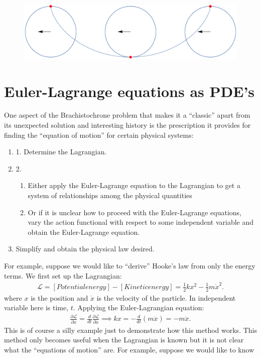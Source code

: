 \documentclass{article}
\newcommand{\p}{\partial}
\newcommand{\lag}{\mathcal{L}}
\newcommand{\f}[2]{\frac{#1}{#2}}
\begin{document}
\begin{figure}[h!]
	\centering
	\includegraphics[scale=0.35, angle=180]{cycloid.eps}
\end{figure}



\section{Euler-Lagrange equations as PDE's}

One aspect of the Brachistochrone problem that makes it a ``classic'' apart from its unexpected solution and interesting history is the prescription it provides for finding the ``equation of motion'' for certain physical systems:
\begin{enumerate}
	\item 1. Determine the Lagrangian.
	\item 2. \begin{enumerate}
		\item Either apply the Euler-Lagrange equation to the Lagrangian to get a system of relationships among the physical quantities
		\item Or if it is unclear how to proceed with the Euler-Lagrange equations, vary the action functional with respect to some independent variable and obtain the Euler-Lagrange equation. 
	\end{enumerate}
	\item Simplify and obtain the physical law desired. 
\end{enumerate}

For example, suppose we would like to ``derive'' Hooke's law from only the energy terms. We first set up the Lagrangian:
\begin{align}
\lag = [Potential energy] - [Kinetic energy] = \f{1}{2}kx^2 - \f{1}{2}m\dot{x}^2.
\end{align} 
where $x$ is the position and $\dot{x}$ is the velocity of the particle. In independent variable here is time, $t$. Applying the Euler-Lagrangian equation:
\begin{align}
\f{\p \lag}{\p x} = \f{d}{dt}\f{\p \lag}{\p \dot{x}} \implies kx = -\f{d}{dt}(m\dot{x}) = -m\ddot{x}.
\end{align}
This is of course a silly example just to demonstrate how this method works. This method only becomes useful when the Lagrangian is known but it is not clear what the ``equations of motion'' are. For example, suppose we would like to know 
\end{document}
